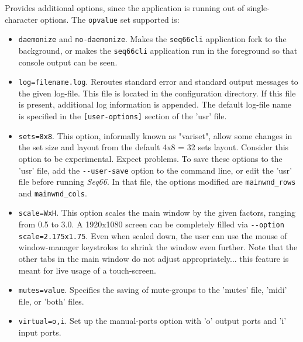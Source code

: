       Provides additional options, since the application is running out of
      single-character options.  The \texttt{opvalue} set supported is:
      \begin{itemize}
         \item \texttt{daemonize} and \texttt{no-daemonize}.
            Makes the \texttt{seq66cli} application fork to the background, or
            makes the \texttt{seq66cli} application
            run in the foreground so that console output can be seen.
         \item \texttt{log=filename.log}.
            Reroutes standard error and standard
            output messages to the given log-file.  This file is located in
            the configuration directory.
            If this file is present, additional log information is appended.
            The default log-file name is specified in the
            \texttt{[user-options]} section of the 'usr' file.
         \item \texttt{sets=8x8}.
            This option, informally known as "variset", allow some changes in
            the set size and layout from the default 4x8 = 32 sets layout.
            Consider this option to be experimental. Expect problems.
            To save these options to the 'usr' file, add the
            \texttt{-{}-user-save} option to the command line, or edit the
            'usr' file before running \textsl{Seq66}.
            In that file, the options modified are \texttt{mainwnd\_rows} and
            \texttt{mainwnd\_cols}.
         \item \texttt{scale=WxH}.
            This option scales the main window by the given factors,
            ranging from 0.5 to 3.0. A 1920x1080 screen can be completely
            filled via \texttt{-{}-option scale=2.175x1.75}. Even when scaled 
            down, the user can use the mouse of window-manager keystrokes to
            shrink the window even further.
            Note that the other tabs in the main window do not adjust
            appropriately... this feature is meant for live usage of
            a touch-screen.
         \item \texttt{mutes=value}. Specifies the saving of mute-groups
            to the 'mutes' file, 'midi' file, or 'both' files.
         \item \texttt{virtual=o,i}. Set up the manual-ports option with 'o'
            output ports and 'i' input ports.
      \end{itemize}

